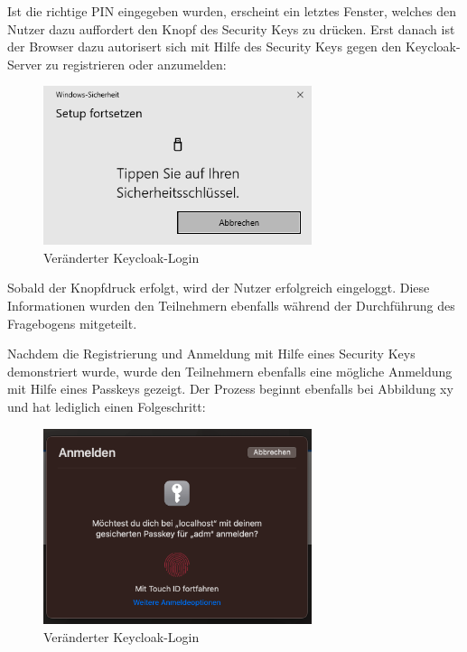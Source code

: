 Ist die richtige PIN eingegeben wurden, erscheint ein letztes Fenster, welches den Nutzer dazu auffordert den Knopf des Security Keys zu drücken. Erst danach ist der Browser dazu autorisert sich mit Hilfe des Security Keys gegen den Keycloak-Server zu registrieren oder anzumelden:

\begin{figure}[h]
	\centering 
	\includegraphics[width=0.7\textwidth]{img/abbildungen/reg004.png}
	\captionsetup{format=hang}
	\caption{Veränderter Keycloak-Login}
\end{figure}

Sobald der Knopfdruck erfolgt, wird der Nutzer erfolgreich eingeloggt. Diese Informationen wurden den Teilnehmern ebenfalls während der Durchführung des Fragebogens mitgeteilt. 

Nachdem die Registrierung und Anmeldung mit Hilfe eines Security Keys demonstriert wurde, wurde den Teilnehmern ebenfalls eine mögliche Anmeldung mit Hilfe eines Passkeys gezeigt. Der Prozess beginnt ebenfalls bei Abbildung xy und hat lediglich einen Folgeschritt:

\begin{figure}[h]
	\centering 
	\includegraphics[width=0.7\textwidth]{img/abbildungen/passkey_demo.png}
	\captionsetup{format=hang}
	\caption{Veränderter Keycloak-Login}
\end{figure}

